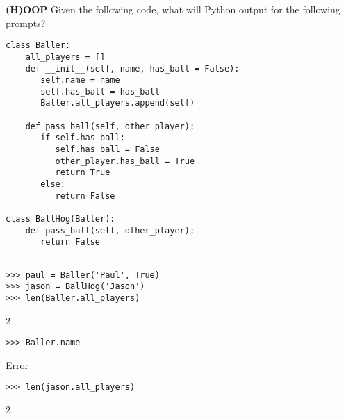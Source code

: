 \begin{blocksection}
\question \textbf{(H)OOP} \newline
Given the following code, what will Python output for the following prompts? 

\begin{lstlisting}
class Baller:
    all_players = []
    def __init__(self, name, has_ball = False):
       self.name = name
       self.has_ball = has_ball
       Baller.all_players.append(self)
    
    def pass_ball(self, other_player):
       if self.has_ball:
          self.has_ball = False
          other_player.has_ball = True
          return True
       else:
          return False

class BallHog(Baller):
    def pass_ball(self, other_player):  
       return False 
       
\end{lstlisting}
\end{blocksection}
\newline
\newline
\newline
\begin{blocksection}

\begin{lstlisting}
>>> paul = Baller('Paul', True)
>>> jason = BallHog('Jason')
>>> len(Baller.all_players)
\end{lstlisting}
\begin{solution}[.2in]
2
\end{solution}

\begin{lstlisting}
>>> Baller.name
\end{lstlisting}
\begin{solution}[.2in]
Error
\end{solution}

\begin{lstlisting}
>>> len(jason.all_players)
\end{lstlisting}
\begin{solution}[.2in]
2
\end{solution}
\end{blocksection}

